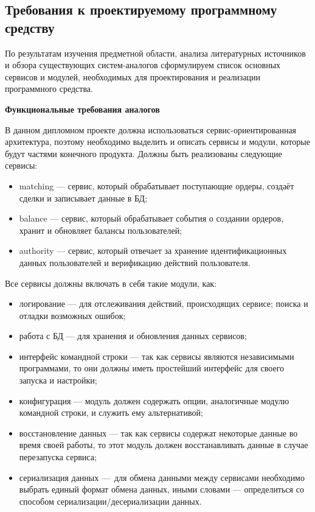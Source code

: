 \subsection{Требования к проектируемому программному средству}\label{sec:analysis:specification}

По результатам изучения предметной области, анализа литературных источников и обзора существующих систем-аналогов сформулируем список основных сервисов и модулей, необходимых для проектирования и реализации программного средства.

\textbf{Функциональные требования аналогов}

В данном дипломном проекте должна использоваться сервис-ориенти\-рованная архитектура, поэтому необходимо выделить и описать сервисы и модули, которые будут частями конечного продукта. Должны быть реализованы следующие сервисы:
\begin{itemize}
    \item matching — сервис, который обрабатывает поступающие ордеры, создаёт сделки и записывает данные в БД;
    \item balance — сервис, который обрабатывает события о создании ордеров, хранит и обновляет балансы пользователей;
    \item authority — сервис, который отвечает за хранение идентификационных данных пользователей и верификацию действий пользователя.
\end{itemize}

Все сервисы должны включать в себя такие модули, как:
\begin{itemize}
    \item логирование — для отслеживания действий, происходящих сервисе; поиска и отладки возможных ошибок;
    \item работа с БД — для хранения и обновления данных сервисов;
    \item интерфейс командной строки — так как сервисы являются независимыми программами, то они должны иметь простейший интерфейс для своего запуска и настройки;
    \item конфигурация — модуль должен содержать опции, аналогичные модулю командной строки, и служить ему альтернативой;
    \item восстановление данных — так как сервисы содержат некоторые данные во время своей работы, то этот модуль должен восстанавливать данные в случае перезапуска сервиса;
    \item сериализация данных — для обмена данными между сервисами необходимо выбрать единый формат обмена данных, иными словами — определиться со способом сериализации/десериализации данных.
\end{itemize}

